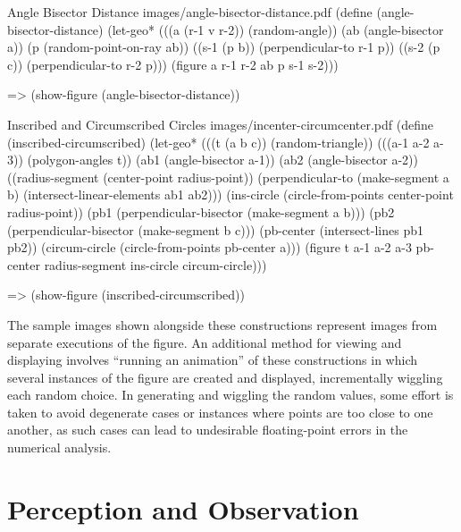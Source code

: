 \begin{pdf-example}
[label=angle-bisector-distance]
{Angle Bisector Distance}
{images/angle-bisector-distance.pdf}
(define (angle-bisector-distance)
  (let-geo* (((a (r-1 v r-2)) (random-angle))
             (ab (angle-bisector a))
             (p (random-point-on-ray ab))
             ((s-1 (p b)) (perpendicular-to r-1 p))
             ((s-2 (p c)) (perpendicular-to r-2 p)))
     (figure a r-1 r-2 ab p s-1 s-2)))

=> (show-figure (angle-bisector-distance))
\end{pdf-example}

\enlargethispage*{-\baselineskip}

\begin{pdf-example}
[label=incircle-circumcircle-fig,
break at=8.5cm]
{Inscribed and Circumscribed Circles}
{images/incenter-circumcenter.pdf}
(define (inscribed-circumscribed)
  (let-geo* (((t (a b c)) (random-triangle))
             (((a-1 a-2 a-3)) (polygon-angles t))
             (ab1 (angle-bisector a-1))
             (ab2 (angle-bisector a-2))
             ((radius-segment (center-point radius-point))
              (perpendicular-to (make-segment a b)
                                (intersect-linear-elements ab1 ab2)))
             (ins-circle (circle-from-points center-point radius-point))
             (pb1 (perpendicular-bisector (make-segment a b)))
             (pb2 (perpendicular-bisector (make-segment b c)))
             (pb-center (intersect-lines pb1 pb2))
             (circum-circle (circle-from-points pb-center a)))
    (figure t a-1 a-2 a-3 pb-center radius-segment
            ins-circle circum-circle)))

=> (show-figure (inscribed-circumscribed))
\end{pdf-example}

The sample images shown alongside these constructions represent images
from separate executions of the figure. An additional method for
viewing and displaying involves ``running an animation'' of these
constructions in which several instances of the figure are created and
displayed, incrementally wiggling each random choice. In generating
and wiggling the random values, some effort is taken to avoid
degenerate cases or instances where points are too close to one
another, as such cases can lead to undesirable floating-point errors
in the numerical analysis.

\section{Perception and Observation}


